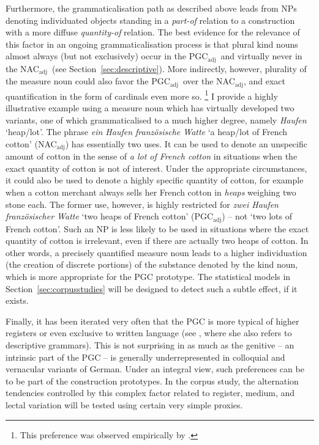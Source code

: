 \documentclass[USenglish]{article}
\newcommand{\Sub}[1]{\ensuremath{\mathrm{_{#1}}}}
\newcommand{\NACa}{NAC\Sub{adj}}
\newcommand{\PGCa}{PGC\Sub{adj}}
\begin{document}
Furthermore, the grammaticalisation path as described above leads from NPs denoting individuated objects standing in a \textit{part-of} relation to a construction with a more diffuse \textit{quantity-of} relation.
The best evidence for the relevance of this factor in an ongoing grammaticalisation process is that plural kind nouns almost always (but not exclusively) occur in the \PGCa\ and virtually never in the \NACa\ (see Section~\ref{sec:descriptive}).
More indirectly, however, plurality of the measure noun could also favor the \PGCa\ over the \NACa, and exact quantification in the form of cardinals even more so.%
\footnote{This preference was observed empirically by \cite{Hentschel1993}.}
I provide a highly illustrative example using a measure noun which has virtually developed two variants, one of which grammaticalised to a much higher degree, namely \textit{Haufen} `heap\slash lot'.
The phrase \textit{ein Haufen französische Watte} `a heap\slash lot of French cotton' (\NACa) has essentially two uses.
It can be used to denote an unspecific amount of cotton in the sense of \textit{a lot of French cotton} in situations when the exact quantity of cotton is not of interest.
Under the appropriate circumstances, it could also be used to denote a highly specific quantity of cotton, for example when a cotton merchant always sells her French cotton in \textit{heaps} weighing two stone each.
The former use, however, is highly restricted for \textit{zwei Haufen französischer Watte} `two heaps of French cotton' (\PGCa) -- not `two lots of French cotton'.
Such an NP is less likely to be used in situations where the exact quantity of cotton is irrelevant, even if there are actually two heaps of cotton.
In other words, a precisely quantified measure noun leads to a higher individuation (the creation of discrete portions) of the substance denoted by the kind noun, which is more appropriate for the PGC prototype.
The statistical models in Section~\ref{sec:corpusstudies} will be designed to detect such a subtle effect, if it exists.

Finally, it has been iterated very often that the PGC is more typical of higher registers or even exclusive to written language (see \citealp[320--323]{Hentschel1993}, where she also refers to descriptive grammars).
This is not surprising in as much as the genitive -- an intrinsic part of the PGC -- is generally underrepresented in colloquial and vernacular variants of German.
Under an integral view, such preferences can be to be part of the construction prototypes.
In the corpus study, the alternation tendencies controlled by this complex factor related to register, medium, and lectal variation will be tested using certain very simple proxies.
\end{document}
